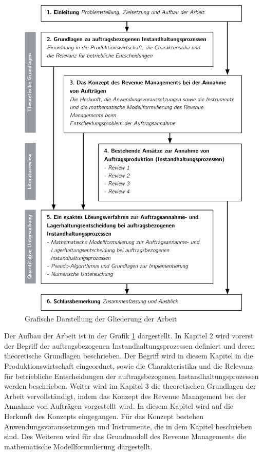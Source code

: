 \begin{figure}[h!]
  \begin{center}
    \includegraphics[width=140mm]{Bilder/Gliederung.pdf}
    \caption{Grafische Darstellung der Gliederung der Arbeit}  \label{Gliederung}
  \end{center}
\end{figure}


Der Aufbau der Arbeit ist in der Grafik \ref{Gliederung} dargestellt. In Kapitel 2 wird vorerst der Begriff der auftragsbezogenen Instandhaltungsprozessen definiert und deren theoretische Grundlagen beschrieben. Der Begriff wird in diesem Kapitel in die Produktionswirtschaft eingeordnet, sowie die Charakteristika und die Relevanz für betriebliche Entscheidungen der auftragsbezogenen Instandhaltungsprozessen werden beschrieben. Weiter wird im Kapitel 3 die theoretischen Grundlagen der Arbeit vervollständigt, indem das Konzept des Revenue Management bei der Annahme von Aufträgen vorgestellt wird. In diesem Kapitel wird auf die Herkunft des Konzepts eingegangen. Für das Konzept bestehen Anwendungsvoraussetzungen und Instrumente, die in dem Kapitel beschrieben sind. Des Weiteren wird für das Grundmodell des Revenue Managements die mathematische Modellformulierung dargestellt.

